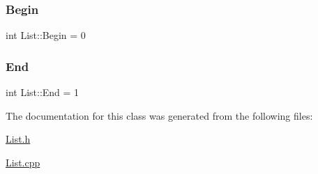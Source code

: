 \subsubsection{\texorpdfstring{Begin}{Begin}}
{\footnotesize\ttfamily int List\+::\+Begin = 0\hspace{0.3cm}{\ttfamily [static]}}

\mbox{\label{classList_afbd07ca49b66b1233c4a6292454b5673}} 
\subsubsection{\texorpdfstring{End}{End}}
{\footnotesize\ttfamily int List\+::\+End = 1\hspace{0.3cm}{\ttfamily [static]}}



The documentation for this class was generated from the following files\+:\begin{DoxyCompactItemize}
\item 
\mbox{\hyperlink{List_8h}{List.\+h}}\item 
\mbox{\hyperlink{List_8cpp}{List.\+cpp}}\end{DoxyCompactItemize}
